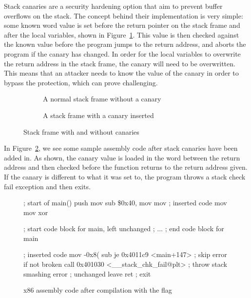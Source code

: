Stack canaries \citep{cowan1998stackguard} are a security hardening option that aim to prevent buffer overflows on the stack. 
The concept behind their implementation is very simple: some known word value is set before the return pointer on the stack frame and after the local variables, shown in Figure~\ref{fig:stackframe}. 
This value is then checked against the known value before the program jumps to the return address, and aborts the program if the canary has changed.
In order for the local variables to overwrite the return address in the stack frame, the canary will need to be overwritten. 
This means that an attacker needs to know the value of the canary in order to bypass the protection, which can prove challenging. 

\begin{figure}[H]
    \begin{subfigure}[l]{.5\textwidth}
        \centering
        \stackFrameTable
        \caption{A normal stack frame without a canary}
    \end{subfigure}%
    \begin{subfigure}[r]{.5\textwidth}
        \centering
        \stackFrameTableCanary
        \caption{A stack frame with a canary inserted}
    \end{subfigure}
    \caption{Stack frame with and without canaries}
    \label{fig:stackframe}
\end{figure}

In Figure~\ref{fig:canarycode}, we see some sample assembly code after stack canaries have been added in. 
As shown, the canary value is loaded in the word between the return address and then checked before the function returns to the return address given. 
If the canary is different to what it was set to, the program throws a stack check fail exception and then exits.

\begin{figure}[H]
\begin{gaslst}
; start of main()
push   %
mov    %
sub    \$0x40,%
mov    %
mov    %
; inserted code
mov    %
mov    %
xor    %

; start code block for main, left unchanged 
;                       ...
; end code block for main

; inserted code 
mov    -0x8(%
sub    %
je     0x4011c9 <main+147>  ; skip error if not broken
call   0x401030 <__stack_chk_fail@plt> ; throw stack smashing error  
; unchanged 
leave
ret    ; exit
\end{gaslst}

\caption{x86 assembly code after compilation with the flag}
\label{fig:canarycode}
\end{figure}

